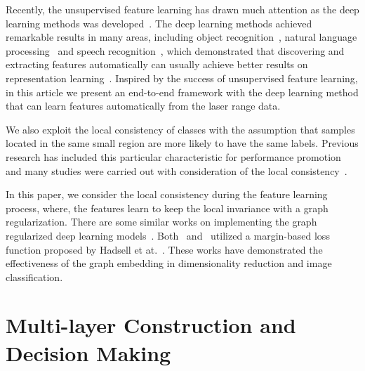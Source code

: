 \documentclass[letterpaper, 10 pt, conference]{ieeeconf}  %
\begin{document}
Recently, the unsupervised feature learning has drawn much attention as the deep learning methods was developed~\cite{HinSal06,Hinton2006,Bengio2007}. The deep learning methods achieved remarkable results in many areas, including object recognition~\cite{boureau2011ask,le2013building}, natural language processing~\cite{collobert2011natural,glorot2011domain} and speech recognition~\cite{dahl2012context}, which demonstrated that discovering and extracting features automatically can usually achieve better results on representation learning~\cite{citeulike:9426230,Rifai:2011:HOC:2034117.2034159,Vincent:2011:CSM:2000609.2000610}. Inspired by the success of unsupervised feature learning, in this article we present an end-to-end framework with the deep learning method that can learn features automatically from the laser range data.

We also exploit the local consistency of classes with the assumption that samples located in the same small region are more likely to have the same labels. Previous research has included this particular characteristic for performance promotion and many studies were carried out with consideration of the local consistency~\cite{ranganathan2011visual,pronobis2012large,mozos2005supervised,martinez2007supervised,ranganathan2010pliss}.

In this paper, we consider the local consistency during the feature learning process, where, the features learn to keep the local invariance with a graph regularization. There are some similar works on implementing the graph regularized deep learning models~\cite{Hadsell:2006:DRL:1153171.1153654,weston2012deep}. Both~\cite{Hadsell:2006:DRL:1153171.1153654} and~\cite{weston2012deep} utilized a margin-based loss function proposed by Hadsell et at.~\cite{hadsell2006dimensionality}. These works have demonstrated the effectiveness of the graph embedding in dimensionality reduction and image classification.



\section{Multi-layer Construction and Decision Making} \label{secMultilayer}
\end{document}
